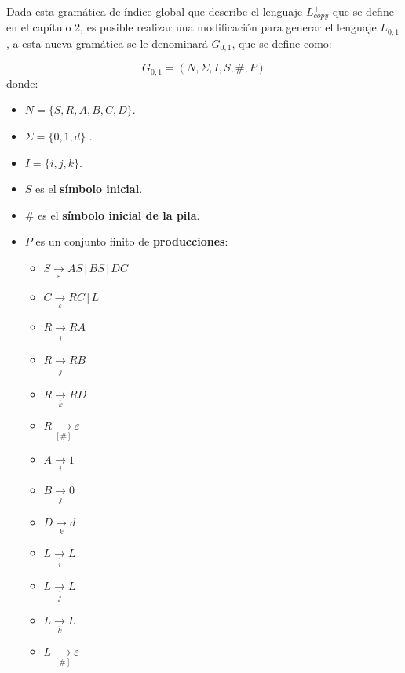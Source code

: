 Dada esta gramática de índice global que describe el lenguaje $L_{copy}^+$ que se define en el capítulo 2, es posible realizar una modificación para generar el lenguaje 
$L_{0,1}$, a esta nueva gramática se le denominará $G_{0,1}$, que se define como:

$$
    G_{0,1} = (N, \Sigma, I, S, \#, P) 
$$
donde:

\begin{itemize}
    \item $N= \{S,R,A,B,C,D\}$.
    \item \( \Sigma=\{0,1,d\} \) .
    \item $I=\{i,j,k\}$.
    \item $S$ es el \textbf{símbolo inicial}.
    \item $\#$ es el \textbf{símbolo inicial de la pila}.
    \item $P$ es un conjunto finito de \textbf{producciones}:
          \begin{multicols}{2}
              \begin{itemize}
                  \item $S\underset{\varepsilon}{\to} AS\,|\,BS\,|\,DC$
                  \item $C\underset{\varepsilon}{\to} RC\,|\,L$
                  \item $R\underset{\overline{i}}{\to} RA$
                  \item $R\underset{\overline{j}}{\to} RB$
                  \item $R\underset{\overline{k}}{\to} RD$
                        
                  \item $R\underset{[\#]}{\to} \varepsilon$
                  \item $A\underset{i}{\to} 1$
                  \item $B\underset{j}{\to} 0$
                  \item $D\underset{k}{\to} d$
                  \item $L\underset{\overline{i}}{\to} L$
                  \item $L\underset{\overline{j}}{\to} L$
                  \item $L\underset{\overline{k}}{\to} L$
                  \item $L\underset{[\#]}{\to} \varepsilon$
              \end{itemize}
          \end{multicols}
\end{itemize}

